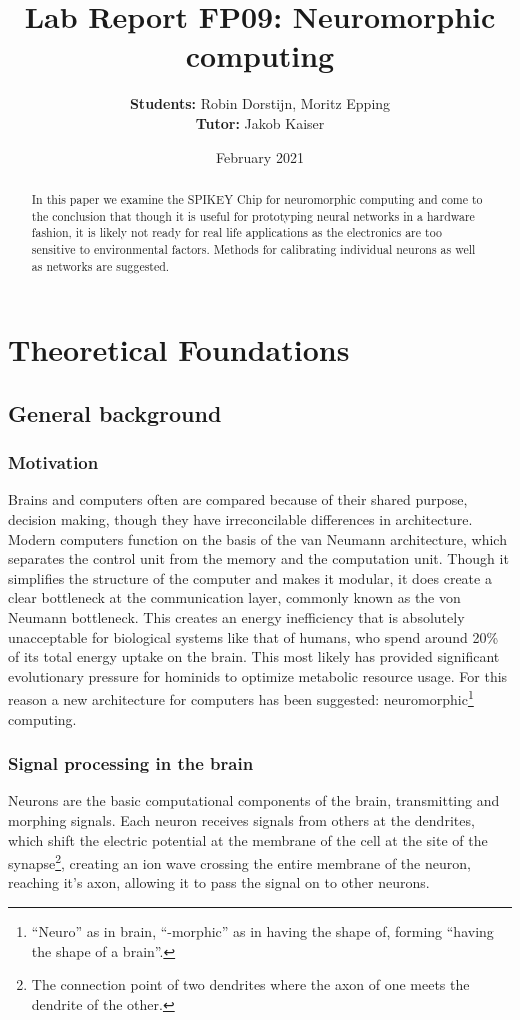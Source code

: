 \documentclass[10pt,a4paper]{article}
\author{\textbf{Students: }Robin Dorstijn, Moritz Epping \\ \textbf{Tutor: }Jakob Kaiser}
\title{Lab Report FP09: Neuromorphic computing}
\date{February 2021}
\begin{document}
\maketitle
\clearpage
\tableofcontents

\clearpage
\begin{abstract}
    In this paper we examine the SPIKEY Chip for neuromorphic computing and
    come to the conclusion that though it is useful for prototyping neural
    networks in a hardware fashion, it is likely not ready for real life
    applications as the electronics are too sensitive to environmental
    factors. Methods for calibrating individual neurons as well as networks
    are suggested.
\end{abstract}

\section{Theoretical Foundations}
\subsection{General background}
\subsubsection{Motivation}
Brains and computers often are compared because of their shared purpose,
decision making, though they have irreconcilable differences in architecture.
Modern computers function on the basis of the van Neumann
architecture\cite{von-Neumann}, which separates the control unit from the memory
and the computation unit. Though it simplifies the structure of the computer and
makes it modular, it does create a clear bottleneck at the communication layer,
commonly known as the von Neumann bottleneck. This creates an energy
inefficiency that is absolutely unacceptable for biological systems like that of
humans, who spend around 20\% of its total energy uptake on the brain\cite{metabolic-rates}.
This most likely has provided significant evolutionary pressure for hominids to
optimize metabolic resource usage\cite{seymour2016fossil}. For this reason a new
architecture for computers has been suggested: neuromorphic\footnote{``Neuro''
as in brain, ``-morphic'' as in having the shape of, forming ``having the shape
of a brain''.} computing.

\subsubsection{Signal processing in the brain}
Neurons are the basic computational components of the
brain, transmitting and morphing signals. Each neuron receives signals from
others at the dendrites, which shift the electric potential at the membrane of
the cell at the site of the synapse\footnote{The connection point of two
dendrites where the axon of one meets the dendrite of the other.}, creating an
ion wave crossing the entire membrane of the neuron, reaching it's axon,
allowing it to pass the signal on to other neurons.
\end{document}
